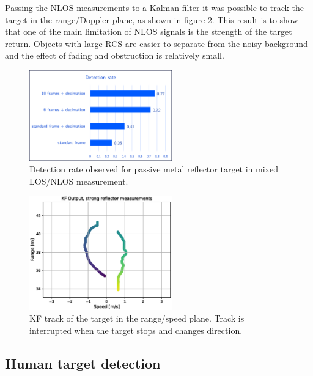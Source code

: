 Passing the NLOS measurements to a Kalman filter it was possible to track the target in the range/Doppler plane, as shown in figure \ref{fig:Test1_kf_track_strong_ref}. This result is to show that one of the main limitation of NLOS signals is the strength of the target return. Objects with large RCS are easier to separate from the noisy background and the effect of fading and obstruction is relatively small.

\begin{figure}[H]
	\centering
	\includegraphics[width=0.55\textwidth]{Images/Test1/detect_hist/detect_hist_cabinet_LMsans.png}
	\caption{\small Detection rate observed for passive metal reflector target in mixed LOS/NLOS measurement.}
	\label{fig:Test1_detect_rate_strong_ref}
\end{figure}



\begin{figure}[H]
	\centering
	\includegraphics[width=0.55\textwidth]{Images/Test1/kf_track.eps}
	\caption{\small KF track of the target in the range/speed plane. Track is interrupted when the target stops and changes direction.}
	\label{fig:Test1_kf_track_strong_ref}
\end{figure}


\subsection{Human target detection}

